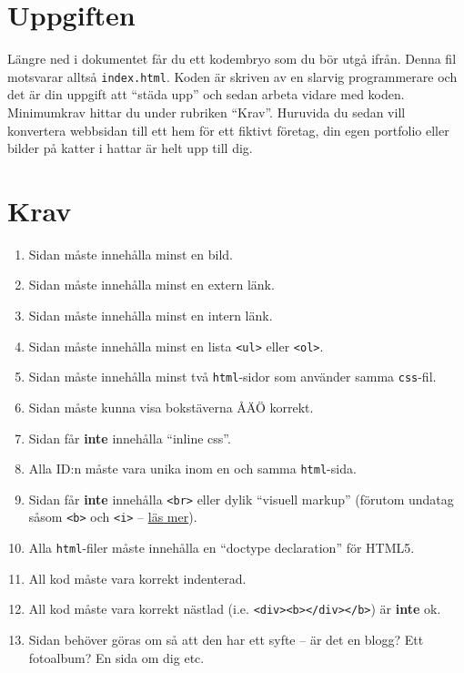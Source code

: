 \documentclass{article}
\begin{document}
\section{Uppgiften}
Längre ned i dokumentet får du ett kodembryo som du bör utgå ifrån. Denna fil motsvarar alltså \texttt{index.html}. Koden är skriven av en slarvig programmerare och det är din uppgift att ``städa upp'' och sedan arbeta vidare med koden. Minimumkrav hittar du under rubriken ``Krav''. Huruvida du sedan vill konvertera webbsidan till ett hem för ett fiktivt företag, din egen portfolio eller bilder på katter i hattar är helt upp till dig. 



\pagebreak
\section{Krav}
\begin{enumerate}
\item Sidan måste innehålla minst en bild.
\item Sidan måste innehålla minst en extern länk.
\item Sidan måste innehålla minst en intern länk.
\item Sidan måste innehålla minst en lista \texttt{<ul>} eller \texttt{<ol>}.
\item Sidan måste innehålla minst två \texttt{html}-sidor som använder samma \texttt{css}-fil.
\item Sidan måste kunna visa bokstäverna ÅÄÖ korrekt.
\item Sidan får \textbf{inte} innehålla ``inline css''.
\item Alla ID:n måste vara unika inom en och samma \texttt{html}-sida.
\item Sidan får \textbf{inte} innehålla \texttt{<br>} eller dylik ``visuell markup'' (förutom undatag såsom \texttt{<b>} och \texttt{<i>} -- \href{http://html5doctor.com/i-b-em-strong-element/}{läs mer}).
\item Alla \texttt{html}-filer måste innehålla en ``doctype declaration'' för HTML5.
\item All kod måste vara korrekt indenterad.
\item All kod måste vara korrekt nästlad (i.e. \texttt{<div><b></div></b>}) är \textbf{inte} ok.
\item Sidan behöver göras om så att den har ett syfte -- är det en blogg? Ett fotoalbum? En sida om dig etc.
\end{enumerate}
\end{document}
